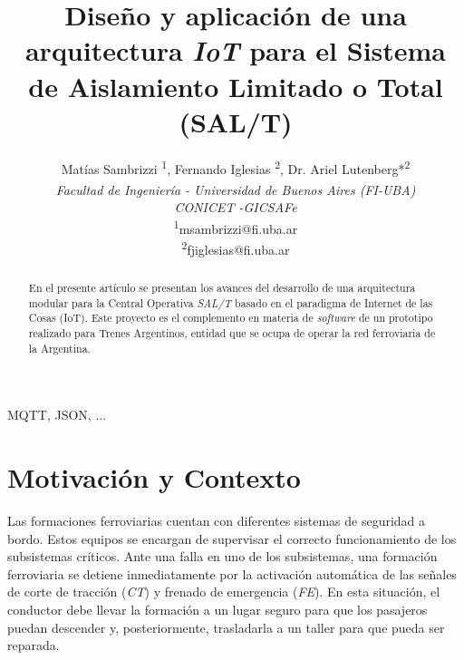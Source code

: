 \documentclass[a4paper]{IEEEtran}
\begin{document}
\title{Diseño y aplicación de una arquitectura \textit{IoT} para el Sistema de Aislamiento Limitado o Total (SAL/T) \\}


\author{

Matías Sambrizzi\textsuperscript{\dag} \textsuperscript{1}, 
Fernando Iglesias\textsuperscript{\dag} \textsuperscript{2}, 
Dr. Ariel Lutenberg*\textsuperscript{2} \\

\textsuperscript{\dag} \textit{Facultad de Ingeniería - Universidad de Buenos Aires (FI-UBA)} \\
\normalsize * \textit{CONICET -GICSAFe} \\

\textsuperscript{1}\small msambrizzi@fi.uba.ar \\
\textsuperscript{2}\small fjiglesias@fi.uba.ar \\

}


\maketitle

\begin{abstract}
En el presente artículo se presentan los avances del desarrollo de una arquitectura modular para la Central Operativa \textit{SAL/T} basado en el paradigma de Internet de las Cosas (IoT). Este proyecto es el complemento en materia de \textit{software} de un prototipo realizado para Trenes Argentinos, entidad que se ocupa de operar la red ferroviaria de la Argentina.
\end{abstract}

\begin{IEEEkeywords}
MQTT, JSON, ...
\end{IEEEkeywords}


\section{Motivación y Contexto}

Las formaciones ferroviarias cuentan con diferentes sistemas de seguridad a bordo. Estos equipos se encargan de supervisar el correcto funcionamiento de los subsistemas críticos. Ante una falla en uno de los subsistemas, una formación ferroviaria se detiene inmediatamente por la activación automática de las señales de corte de tracción (\textit{CT}) y frenado de emergencia (\textit{FE}). En esta situación, el conductor debe llevar la formación a un lugar seguro para que los pasajeros puedan descender y, posteriormente, trasladarla a un taller para que pueda ser reparada.
\\
\end{document}
